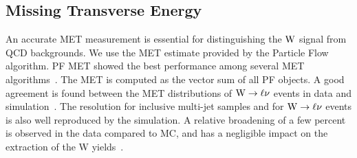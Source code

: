 \subsection{Missing Transverse Energy}
\label{sec:MET}
An accurate MET measurement is essential for distinguishing
the $\mathrm{W}$ signal from QCD backgrounds. 
We use the MET estimate provided by the Particle Flow algorithm.
PF MET showed the best performance
among several MET algorithms~\cite{PFMET}.
The MET is computed as the vector sum of all PF objects.
A good agreement is found between the MET
distributions of $\mathrm{W} \rightarrow \ell\nu$ events in data and simulation~\cite{metPAS}.
The resolution for inclusive multi-jet samples and for
$\mathrm{W} \rightarrow \ell\nu$ events is also well reproduced by the simulation.  
A relative broadening of a few percent is observed in the data compared to MC,  
and has a negligible impact on the
extraction of the W yields~\cite{WZCMS:2010}.
